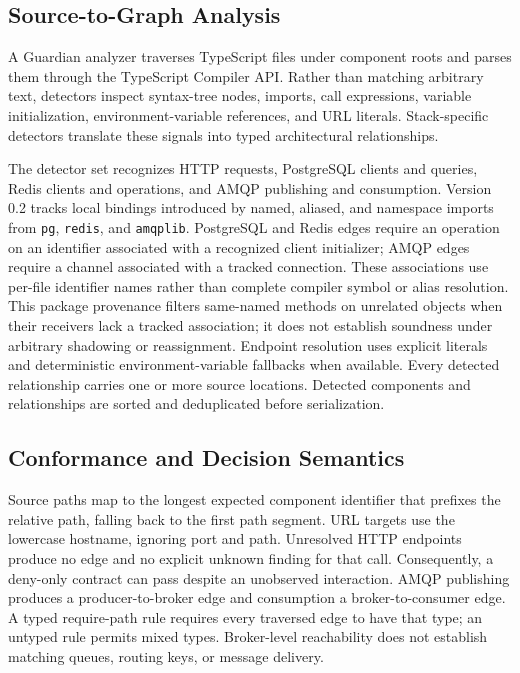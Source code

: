 \subsection{Source-to-Graph Analysis}

A Guardian analyzer traverses TypeScript files under component roots and parses them through the TypeScript Compiler API. Rather than matching arbitrary text, detectors inspect syntax-tree nodes, imports, call expressions, variable initialization, environment-variable references, and URL literals. Stack-specific detectors translate these signals into typed architectural relationships.

The detector set recognizes HTTP requests, PostgreSQL clients and queries, Redis clients and operations, and AMQP publishing and consumption. Version 0.2 tracks local bindings introduced by named, aliased, and namespace imports from \texttt{pg}, \texttt{redis}, and \texttt{amqplib}. PostgreSQL and Redis edges require an operation on an identifier associated with a recognized client initializer; AMQP edges require a channel associated with a tracked connection. These associations use per-file identifier names rather than complete compiler symbol or alias resolution. This package provenance filters same-named methods on unrelated objects when their receivers lack a tracked association; it does not establish soundness under arbitrary shadowing or reassignment. Endpoint resolution uses explicit literals and deterministic environment-variable fallbacks when available. Every detected relationship carries one or more source locations. Detected components and relationships are sorted and deduplicated before serialization.

\subsection{Conformance and Decision Semantics}

Source paths map to the longest expected component identifier that prefixes the relative path, falling back to the first path segment. URL targets use the lowercase hostname, ignoring port and path. Unresolved HTTP endpoints produce no edge and no explicit unknown finding for that call. Consequently, a deny-only contract can pass despite an unobserved interaction. AMQP publishing produces a producer-to-broker edge and consumption a broker-to-consumer edge. A typed require-path rule requires every traversed edge to have that type; an untyped rule permits mixed types. Broker-level reachability does not establish matching queues, routing keys, or message delivery.


